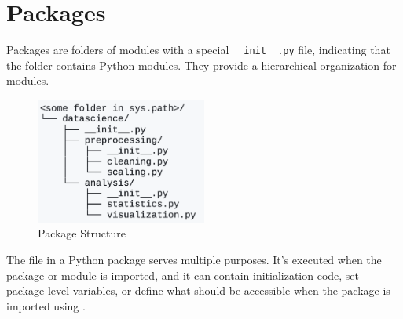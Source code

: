 \section{Packages}

Packages are folders of modules with a special \texttt{\_\_init\_\_.py} file, indicating that the folder
contains Python modules. They provide a hierarchical organization for modules.

\begin{figure}
    \centering
    \includegraphics[width=0.5\textwidth]{assets/py_packages.png}
    \caption{Package Structure}
    \label{fig:packages}
\end{figure}

\begin{observationblock}
    The  file in a Python package serves multiple purposes. It's executed when the
    package or module is imported, and it can contain initialization code, set package-level variables,
    or define what should be accessible when the package is imported using .
\end{observationblock}
